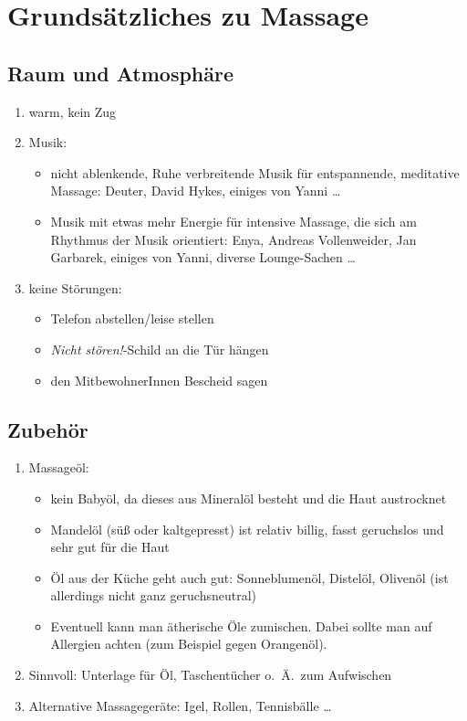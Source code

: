 \section{Grundsätzliches zu Massage}

\subsection{Raum und Atmosphäre}
\begin{enumerate}
  \item warm, kein Zug
  \item Musik:
    \begin{itemize}
      \item nicht ablenkende, Ruhe verbreitende Musik für entspannende, meditative Massage: Deuter, David Hykes, einiges von Yanni \ldots
      \item Musik mit etwas mehr Energie für intensive Massage, die sich am Rhythmus der Musik orientiert: Enya, Andreas Vollenweider, Jan Garbarek, einiges von Yanni, diverse Lounge-Sachen \ldots
    \end{itemize}
  \item keine Störungen:
    \begin{itemize}
      \item Telefon abstellen/leise stellen
      \item \emph{Nicht stören!}-Schild an die Tür hängen
      \item den MitbewohnerInnen Bescheid sagen
    \end{itemize}
\end{enumerate}
    
\subsection{Zubehör}
\begin{enumerate}
  \item Massageöl:
    \begin{itemize}
      \item kein Babyöl, da dieses aus Mineralöl besteht und die Haut austrocknet
      \item Mandelöl (süß oder kaltgepresst) ist relativ billig, fasst geruchslos und sehr gut für die Haut
      \item Öl aus der Küche geht auch gut: Sonneblumenöl, Distelöl, Olivenöl (ist allerdings nicht ganz geruchsneutral)
      \item Eventuell kann man ätherische Öle zumischen. Dabei sollte man auf Allergien achten (zum Beispiel gegen Orangenöl).
    \end{itemize}
  \item Sinnvoll: Unterlage für Öl, Taschentücher o.~Ä.~zum Aufwischen
  \item Alternative Massagegeräte: Igel, Rollen, Tennisbälle \ldots
\end{enumerate}

